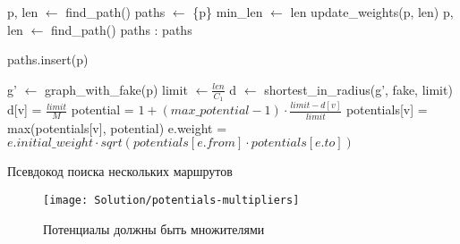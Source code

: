 \begin{algorithm}[!ht]
    \begin{algorithmic}
            \State p, len $\gets$ find\_path()
            \State paths $\gets$ \{p\}
            \State min\_len $\gets$ len
                \State update\_weights(p, len)
                \State p, len $\gets$ find\_path()
                    \State \Return paths
                \EndIf
                :
                        \State \Return paths
                    \EndIf
                \EndFor

                \State paths.insert(p)
           \EndWhile
        \EndFunction

            \State g' $\gets$ graph\_with\_fake(p)
            \State limit $\gets \frac{len}{C_1}$
            \State d $\gets$ shortest\_in\_radius(g', fake, limit)
                \State d[v] = $\frac{limit}{M}$
            \EndFor
                \State potential = $1 + (max\_potential - 1) \cdot \frac{limit - d[v]}{limit}$
                \State potentials[v] = max(potentials[v], potential)
            \EndFor
                \State e.weight = $e.initial\_weight \cdot
                sqrt(potentials[e.from] \cdot potentials[e.to])$
            \EndFor
        \EndFunction
    \end{algorithmic}
    \caption{Псевдокод поиска нескольких маршрутов}
    \label{alg:multipath}
\end{algorithm}

\begin{figure}
    \texttt{[image: Solution/potentials-multipliers]}
    \caption{Потенциалы должны быть множителями}
    \label{fig:potentials-multipliers}
\end{figure}

